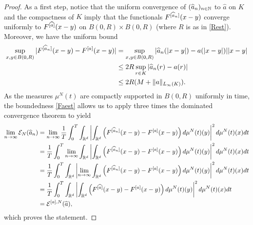 \begin{proof}
As a first step, notice that the uniform convergence of $(\widehat a_n)_{n \in \mathbb{N}}$ to $\widehat a$ on $K$ and the compactness of $K$ imply that the functionals $F^{[\widehat a_n]}(x-y)$ converge uniformly to $F^{[\widehat a]}(x-y)$ on $B(0,R)\times B(0,R)$ (where $R$ is as in \eqref{Rest}). Moreover, we have the uniform bound
\begin{align}
\begin{split}\label{Faest}
\sup_{x,y\in B(0,R)}|F^{[\widehat a_n]}(x-y) - F^{[a]}(x-y)| &= \sup_{x,y\in B(0,R)}|\widehat a_n(|x-y|) -  a(|x-y|)| |x-y| \\
&\leq 2R \sup_{r\in K} |\widehat a_n(r) -  a(r)| \\
& \leq 2R(M + \|a\|_{L_{\infty}(K)}).
\end{split}
\end{align}
As the measures $\mu^N(t)$ are compactly supported in $B(0,R)$ uniformly in time, the boundedness \eqref{Faest} allows us to apply three times the dominated convergence theorem to yield
\begin{align*}
\lim_{n \rightarrow \infty} \mathcal E_N(\widehat a_n) &= \lim_{n \rightarrow \infty}\frac{1}{T}\int_0^T\int_{\mathbb{R}^d} \left| \int_{\mathbb{R}^d}
			\left(F^{[\widehat a_n]}(x-y)-F^{[a]}(x-y)\right)d\mu^N(t)(y)\right|^2d\mu^N(t)(x) dt\\
			&= \frac{1}{T}\int_0^T\lim_{n \rightarrow \infty}\int_{\mathbb{R}^d} \left| \int_{\mathbb{R}^d}
			\left(F^{[\widehat a_n]}(x-y)-F^{[a]}(x-y)\right)d\mu^N(t)(y)\right|^2 d\mu^N(t)(x) dt\\
			&= \frac{1}{T}\int_0^T\int_{\mathbb{R}^d} \left| \lim_{n \rightarrow \infty}\int_{\mathbb{R}^d}
			\left(F^{[\widehat a_n]}(x-y)-F^{[a]}(x-y)\right)d\mu^N(t)(y)\right|^2 d\mu^N(t)(x) dt\\
			&= \frac{1}{T}\int_0^T\int_{\mathbb{R}^d} \left| \int_{\mathbb{R}^d}
			\left(F^{[\widehat a]}(x-y)-F^{[a]}(x-y)\right)d\mu^N(t)(y)\right|^2 d\mu^N(t)(x) dt\\
&=  \mathcal E^{[a],N}(\widehat a),
\end{align*}
which proves the statement.


\end{proof}
